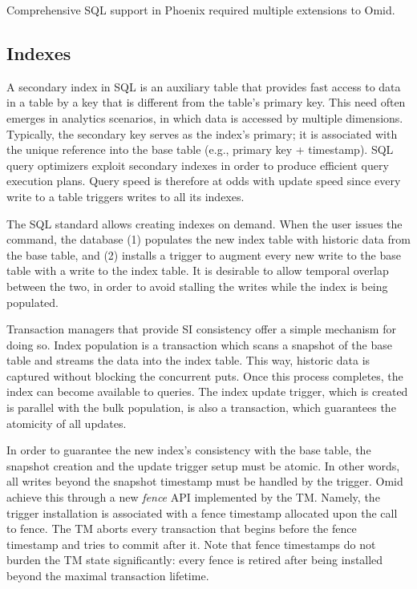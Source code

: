 Comprehensive SQL support in Phoenix required multiple extensions to Omid. 

\subsection{Indexes}
A secondary index in SQL is an auxiliary table that provides fast access to data in a table 
by a key that is different from the table's primary key. This need often emerges in analytics scenarios, in
which data is accessed by multiple dimensions. Typically, the secondary key serves as the index's primary;
it is associated with the unique reference into the base table (e.g., primary key + timestamp). SQL query 
optimizers exploit secondary indexes in order to produce efficient query execution plans. Query speed 
is therefore at odds with update speed since every write to a table triggers writes to all its indexes. 

The SQL standard allows creating indexes on demand. When the user issues the {} 
command, the database (1) populates the new index table with historic data from the base table, and
(2) installs a trigger to augment every new write to the base table with a write to the index table. 
It is desirable to allow temporal overlap between the two, in order to avoid stalling the writes while 
the index is being populated. 

Transaction managers that provide SI consistency offer a simple mechanism for doing so. Index 
population is a transaction which scans a snapshot of the base table and streams the data into the  
index table. This way, historic data is captured without blocking the concurrent puts. Once this 
process completes, the index can become available to queries. The index update trigger, which is 
created is parallel with the bulk population, is also a transaction, which guarantees the atomicity of 
all updates. 

In order to guarantee the new index's consistency with the base table, the snapshot creation 
and the update trigger setup must be atomic. In other words, all writes beyond the snapshot   
timestamp must be handled by the trigger. Omid achieve this through a new {\em fence\/} API
implemented by the TM. Namely, the trigger installation is associated with a fence timestamp 
allocated upon the call to fence. The TM aborts every transaction that begins before the fence 
timestamp and tries to commit after it. Note that fence timestamps do not burden the TM state 
significantly: every fence is retired after being installed beyond the maximal transaction lifetime. 

